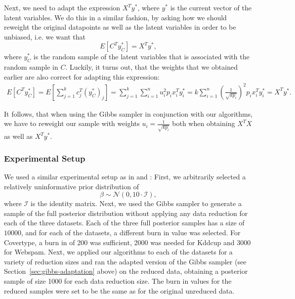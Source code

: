 Next, we need to adapt the expression
$X^Ty^\ast$, where $y^\ast$ is the current vector of the latent
variables. We do this in a similar fashion, by asking
how we should reweight the original datapoints as well as the
latent variables in order to be unbiased, i.e. we want that
\begin{equation*}
    E\left[ C^T y_C^\ast \right] = X^T y^\ast,
\end{equation*}
where $y_C^\ast$ is the random sample of the latent variables that
is associated with the random sample in $C$.
Luckily, it turns out, that the weights that we obtained earlier
are also correct for adapting this expression:
\begin{align*}
    E\left[ C^T y_C^\ast \right] = E\left[ \sum_{j=1}^k c_j^T (y_C^\ast)_j \right]
    = \sum_{j=1}^k \sum_{i=1}^n u_i^2 p_i x_i^T y^\ast_i
    = k \sum_{i=1}^n \left(\frac{1}{\sqrt{kp_i}}\right)^2 p_i x_i^T y^\ast_i
    = X^T y^\ast.
\end{align*}

It follows, that when using the Gibbs sampler in conjunction
with our algorithms, we have to reweight our sample with weights
$u_i = \frac{1}{\sqrt{k p_i}}$ both when obtaining $X^TX$ as
well as $X^Ty^\ast$.

\subsubsection{Experimental Setup}

We used a similar experimental setup
as in \cite{scalable-bayesian-logreg} and
\cite{bayesian-regression}:
First, we arbitrarily selected a relatively uninformative
prior distribution of
\begin{equation*}
    \beta \sim \mathcal{N}(0, 10 \cdot \mathcal{I}),
\end{equation*}
where $\mathcal{I}$ is the identity matrix.
Next, we used the Gibbs sampler
to generate a sample of the full posterior
distribution without applying any data reduction for each
of the three datasets.
Each of the three full posterior samples has a size of $10000$,
and for each of the datasets, a different
burn in value was selected. For Covertype, a burn in
of 200 was sufficient, 2000 was needed for Kddcup and 3000
for Webspam.
Next, we applied our algorithms to each of the datasets
for a variety of reduction sizes and ran the adapted version of
the Gibbs sampler (see Section~\ref{sec:gibbs-adaptation} above)
on the reduced data, obtaining a posterior sample of size 1000
for each data reduction size. The burn in values for
the reduced samples were set to be
the same as for the original unreduced data.


